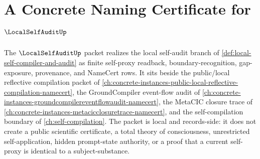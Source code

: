 \chapter{A Concrete Naming Certificate for $\LocalSelfAuditUp$}
\label{ch:concrete-instances-local-self-audit-namecert}

The $\LocalSelfAuditUp$ packet realizes the local self-audit branch of \autoref{def:local-self-compiler-and-audit} as finite self-proxy readback, boundary-recognition, gap-exposure, provenance, and NameCert rows. It sits beside the public/local reflective compilation packet of \autoref{ch:concrete-instances-public-local-reflective-compilation-namecert}, the GroundCompiler event-flow audit of \autoref{ch:concrete-instances-groundcompilereventflowaudit-namecert}, the MetaCIC closure trace of \autoref{ch:concrete-instances-metacicclosuretrace-namecert}, and the self-compilation boundary of \autoref{ch:self-compilation}. The packet is local and records-side: it does not create a public scientific certificate, a total theory of consciousness, unrestricted self-application, hidden prompt-state authority, or a proof that a current self-proxy is identical to a subject-substance.

